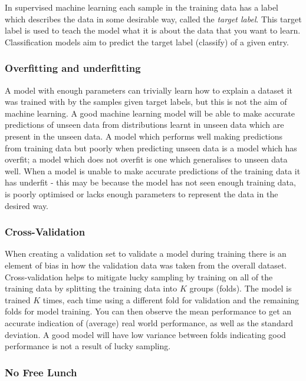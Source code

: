 \documentclass[11pt]{article}
\begin{document}
In supervised machine learning each sample in the training data has a label which describes the data in some desirable way, called the \textit{target label}. This target label is used to teach the model what it is about the data that you want to learn. Classification models aim to predict the target label (classify) of a given entry.

\subsubsection{Overfitting and underfitting}

A model with enough parameters can trivially learn how to explain a dataset it was trained with by the samples given target labels, but this is not the aim of machine learning. A good machine learning model will be able to make accurate predictions of unseen data from distributions learnt in unseen data which are present in the unseen data. A model which performs well making predictions from training data but poorly when predicting unseen data is a model which has overfit; a model which does not overfit is one which generalises to unseen data well. When a model is unable to make accurate predictions of the training data it has underfit - this may be because the model has not seen enough training data, is poorly optimised or lacks enough parameters to represent the data in the desired way.

\subsubsection{Cross-Validation}
\label{crossval}

When creating a validation set to validate a model during training there is an element of bias in how the validation data was taken from the overall dataset. Cross-validation helps to mitigate lucky sampling by training on all of the training data by splitting the training data into $K$ groups (folds). The model is trained $K$ times, each time using a different fold for validation and the remaining folds for model training. You can then observe the mean performance to get an accurate indication of (average) real world performance, as well as the standard deviation. A good model will have low variance between folds indicating good performance is not a result of lucky sampling.

\subsubsection{No Free Lunch}
\end{document}
